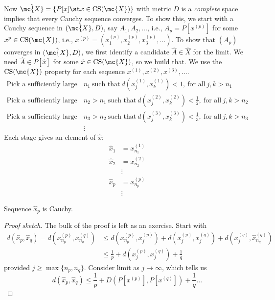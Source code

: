 Now \(\hat{\mc{X}}=\{P[x]\st x\in\operatorname{CS}(\mc{X})\}\) with metric \(D\) is a \emph{complete} space implies that every Cauchy sequence converges. To show this, we start with a Cauchy sequence in \((\hat{\mc{X}},D)\), say \(A_1,A_2,\dots\), i.e., \(A_p=P[x^{(p)}]\) for some \(x^p\in\operatorname{CS}(\mc{X})\), i.e., \(x^{(p)}=(x_1^{(p)},x_2^{(p)},x_3^{(p)},\dots)\). To show that \((A_p)\) converges in \((\hat{\mc{X}},D)\), we first identify a candidate \(\hat{A}\in\hat{X}\) for the limit. We need \(\hat{A}\in P[\hat{x}]\) for some \(\hat{x}\in\operatorname{CS}(\mc{X})\), so we build that. We use the \(\operatorname{CS}(\mc{X})\) property for each sequence \(x^{(1)},x^{(2)},x^{(3)},\dots\).
\begin{align*}
	\text{Pick a sufficiently large}~&n_1~\text{such that}~d(x_j^{(1)},x_k^{(1)})<1,~ \text{for all}~j,k>n_1\\
	\text{Pick a sufficiently large}~&n_2>n_1~\text{such that}~d(x_j^{(2)},x_k^{(2)})<\frac{1}{2},~ \text{for all}~j,k>n_2\\
	\text{Pick a sufficiently large}~&n_3>n_2~\text{such that}~d(x_j^{(3)},x_k^{(3)})<\frac{1}{3},~ \text{for all}~j,k>n_3\\
	&\vdots
\end{align*}
Each stage gives an element of \(\hat{x}\):
\begin{align*}
	\hat{x}_1&=x_{n_1}^{(1)}\\
	\hat{x}_2&=x_{n_2}^{(2)}\\
	&\vdots\\
	\hat{x}_p&=x_{n_p}^{(p)}\\
	&\vdots
\end{align*}
\begin{claim}
	Sequence \(\hat{x}_p\) is Cauchy.
\end{claim}
\begin{proof}[Proof sketch]
	The bulk of the proof is left as an exercise. Start with 
	\begin{align*}
		d(\hat{x}_p,\hat{x}_q)=d(x_{n_p}^{(p)},x_{n_q}^{(q)})&\leq d(x_{n_p}^{(p)},x_j^{(p)})+d(x_j^{(p)},x_j^{(q)})+d(x_j^{(q)},\hat{x}_{n_q}^{(q)})\\
		&\leq \frac{1}{p}+d(x_j^{(p)},x_j^{(q)})+\frac{1}{q}
	\end{align*}
	provided \(j\geq\operatorname{max}\{n_p,n_q\}\). Consider limit as \(j\to\infty\), which tells us 
	\begin{equation*}
		d(\hat{x}_p,\hat{x}_q)\leq \frac{1}{p}+D(P[x^{(p)}],P[x^{(q)}])+\frac{1}{q}\dots
	\end{equation*}
\end{proof}
